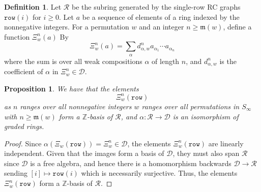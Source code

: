 \documentclass{amsart}
\newtheorem{proposition}[lemma]{Proposition}
\theoremstyle{definition}
\newtheorem{definition}[lemma]{Definition}
\theoremstyle{remark}
\numberwithin{equation}{subsection}
\newcommand{\wof}[1]{w_{#1}}
\newcommand{\hr}{\mathtt{ht}}
\newcommand{\dsch}{\ensuremath{\Xi}}
\newcommand{\dcoma}{\mathcal{D}}
\newcommand{\maxd}{\mathfrak{m}}
\begin{document}


\begin{definition}
Let $\mathcal{R}$  be the subring generated by the single-row RC graphs $\mathtt{row}(i)$ for $i\geq 0$. Let $a$ be a sequence of elements of a ring indexed by the nonnegative integers. For a permutation $w$ and an integer $n\geq \maxd(w)$, define a function $\dsch_w^n(a)$ By
$$\dsch_w^n(a) = \sum_{\alpha} d_{\alpha, w}^n a_{\alpha_1} \cdots a_{\alpha_n}$$
where the sum is over all weak compositions $\alpha$ of length $n$, and $d_{\alpha, w}^n$ is the coefficient of $\alpha$ in $\dsch_w^n\in\dcoma$.
\end{definition}

\begin{proposition}
We have that the elements
$$\dsch_w^n(\mathtt{row})$$
as $n$ ranges over all nonnegative integers $w$ ranges over all permutations in $S_\infty$ with $n\geq \maxd(w)$ form a $\mathbb{Z}$-basis of $\mathcal{R}$, and $\alpha:\mathcal{R}\to \dcoma$ is an isomorphism of graded rings.
\end{proposition}
\begin{proof}
Since $\alpha(\dsch_w(\mathtt{row})) = \dsch_w^n\in \dcoma$, the elements $\dsch_w^n(\mathtt{row})$ are linearly independent. Given that the images form a basis of $\dcoma$, they must also span $\mathcal{R}$ since $\dcoma$ is a free algebra, and hence there is a homomorphism backwards $\dcoma\to \mathcal{R}$ sending $[i]\mapsto \mathtt{row}(i)$ which is necessarily surjective. Thus, the elements $\dsch_w^n(\mathtt{row})$ form a $\mathbb{Z}$-basis of $\mathcal{R}$.
\end{proof}
\end{document}
